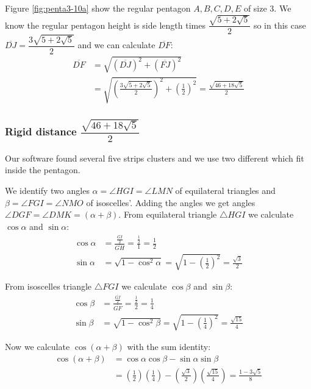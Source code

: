 \documentclass[11pt]{article}
\begin{document}
Figure \ref{fig:penta3-10a} show the regular pentagon $A,B,C,D,E$ of size $3$. We know the regular pentagon height is side length times $\dfrac{\sqrt{5+2\sqrt5}}2$ so in this case $\overline{DJ} = \dfrac{3\sqrt{5+2\sqrt5}}2$ and we can calculate $\overline{DF}$:
\begin{align}
\overline{DF} &= \sqrt{(\overline{DJ})^2 + (\overline{FJ})^2}\nonumber\\
 &= \sqrt{\left(\frac{3\sqrt{5+2\sqrt5}}2\right)^2 + \left(\frac{1}2\right)^2}
 = \frac{\sqrt{46+18\sqrt5}}2
\end{align}

\subsubsection{Rigid distance $\dfrac{\sqrt{46+18\sqrt5}}2$}

Our software found several five strips clusters and we use two different which fit inside the pentagon.

We identify two angles $\alpha = \angle{HGI} = \angle{LMN}$ of equilateral triangles and $\beta = \angle{FGI} = \angle{NMO}$ of isoscelles'. Adding the angles we get angles $\angle{DGF} = \angle{DMK} = (\alpha + \beta)$. From equilateral triangle $\triangle{HGI}$ we calculate $\cos\alpha$ and $\sin\alpha$:
\begin{align}
\cos\alpha &= \frac{\frac{\overline{GI}}2}{\overline{GH}} = \frac{\frac{1}2}1 = \frac{1}2\\
\sin\alpha &= \sqrt{1 - \cos^2\alpha} = \sqrt{1 - \left(\frac{1}2\right)^2} = \frac{\sqrt3}2
\end{align}

From isoscelles triangle $\triangle{FGI}$ we calculate $\cos\beta$ and $\sin\beta$:
\begin{align}
\cos\beta &= \frac{\frac{\overline{GI}}2}{\overline{GF}} = \frac{\frac{1}2}{2} = \frac{1}4\\
\sin\beta &= \sqrt{1 - \cos^2\beta} = \sqrt{1 - \left(\frac{1}4\right)^2} = \frac{\sqrt{15}}4
\end{align}

Now we calculate $\cos(\alpha+\beta)$ with the sum identity:
\begin{align}
\cos(\alpha+\beta) &= \cos\alpha\cos\beta - \sin\alpha\sin\beta \nonumber\\
 &= \left(\frac{1}2\right)\left(\frac{1}4\right)
  -\left(\frac{\sqrt3}2\right)\left(\frac{\sqrt{15}}4\right)
 = \frac{1 - 3\sqrt5}8
\end{align}
\end{document}
